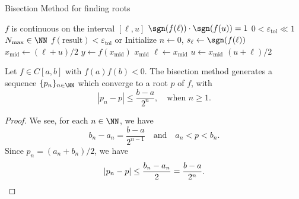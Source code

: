 \begin{algorithm}\label{alg:root:bisection-method}
  \caption{Bisection Method for finding roots}
  \begin{algorithmic}[1]
    \Require $f$ is continuous on the interval $[\ell,u]$
    \Require $\sgn(f(\ell))\cdot\sgn(f(u))=1$
    \Require $0<\varepsilon_{\text{tol}}\ll 1$
    \Require $N_{\text{max}}\in\NN$
    \Ensure $f(\mbox{result}) < \varepsilon_{\text{tol}}$ or 
    \State Initialize $n\gets 0$, $s_{\ell}\gets\sgn(f(\ell))$
      \State $x_{\text{mid}}\gets(\ell+u)/2$
      \State $y\gets f(x_{\text{mid}})$
      \State\Return $x_{\text{mid}}$
      \State $\ell\gets x_{\text{mid}}$
      \Else{}
      \State $u\gets x_{\text{mid}}$
      \EndIf
    \EndFor
    \State\Return $(u+\ell)/2$
  \EndFunction
\end{algorithmic}
\end{algorithm}

\begin{thm}[Bolzano]\label{thm:root:bisection:bolzano}
  Let $f\in C[a,b]$ with $f(a)f(b) < 0$. The bisection method generates
  a sequence $\{p_{n}\}_{n\in\NN}$ which converge to a root $p$ of $f$,
  with
  \begin{equation*}
    |p_{n} - p| \leq\frac{b-a}{2^{n}},\quad\mbox{when }n\geq1.
  \end{equation*}
\end{thm}
\begin{proof}
  We see, for each $n\in\NN$, we have
  \begin{equation}
    b_{n} - a_{n} = \frac{b-a}{2^{n-1}}\quad\mbox{and}\quad a_{n}<p<b_{n}.
  \end{equation}
  Since $p_{n} = (a_{n}+b_{n})/2$, we have
  \begin{equation*}
    |p_{n} - p|\leq\frac{b_{n}-a_{n}}{2} = \frac{b-a}{2^{n}}.\qedhere
  \end{equation*}
\end{proof}


